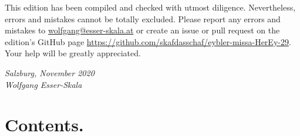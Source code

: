 \documentclass[parskip=full]{scrreprt}
\newif\iftemplate\templatetrue
\begin{document}
This edition has been compiled and checked with utmost diligence. Nevertheless, errors and mistakes cannot be totally excluded. Please report any errors and mistakes to \url{wolfgang@esser-skala.at} or create an issue or pull request on the edition’s GitHub page \url{https://github.com/skafdasschaf/eybler-missa-HerEy-29}. Your help will be greatly appreciated.

\bigskip
\textit{Salzburg, November 2020\\
Wolfgang Esser-Skala}

\cleardoublepage
\chapter*{Contents.}


\cleardoublepage
\fi

\iftemplate

\fi
\end{document}
